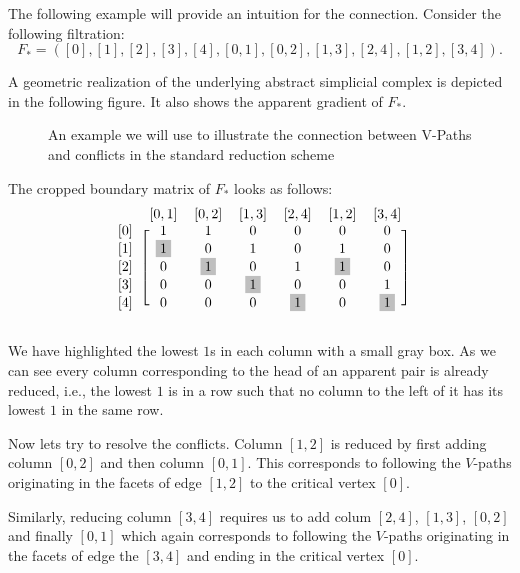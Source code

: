 The following example will provide an intuition for the connection. Consider the following filtration:
\[
    F_* = ([0],[1],[2],[3],[4],[0,1],[0,2], [1,3], [2,4], [1,2], [3,4]).
\]

A geometric realization of the underlying abstract simplicial complex is depicted in the following figure. It also shows the apparent gradient of $F_*$.

\begin{figure}[H]
\noindent%
\centering%

\caption{An example we will use to illustrate the connection between V-Paths and conflicts in the standard reduction scheme}
\label{fig:paths_and_computations}
\end{figure}

The cropped boundary matrix of $F_*$ looks as follows:
\[
\begin{blockarray}{ccccccc}
& [0,1] & [0,2] & [1,3] & [2,4] & [1,2] & [3,4] \\
\begin{block}{c[cccccc]}
             [0] & 1 & 1 & 0 & 0 & 0 & 0 \\*
  \left[1\right] & \colorbox{lightgray}{1} & 0 & 1 & 0 & 1 & 0 \\*
  \left[2\right] & 0 & \colorbox{lightgray}{1}  & 0 & 1 & \colorbox{lightgray}{1}  & 0 \\*
  \left[3\right] & 0 & 0 & \colorbox{lightgray}{1}  & 0 & 0 & 1 \\*
  \left[4\right] & 0 & 0 & 0 & \colorbox{lightgray}{1}  & 0 & \colorbox{lightgray}{1}   \\*
\end{block}
\end{blockarray}
\]

We have highlighted the lowest $1$s in each column with a small gray box. As we can see every column corresponding to the head of an apparent pair is already reduced, i.e., the lowest $1$ is in a row such that no column to the left of it has its lowest $1$ in the same row.

Now lets try to resolve the conflicts. Column $[1,2]$ is reduced by first adding column $[0,2]$ and then column $[0,1]$. This corresponds to following the $V$-paths originating in the facets of edge $[1,2]$ to the critical vertex $[0]$.

Similarly, reducing column $[3,4]$ requires us to add colum $[2,4]$, $[1,3]$, $[0,2]$ and finally $[0,1]$ which again corresponds to following the $V$-paths originating in the facets of edge the $[3,4]$ and ending in the critical vertex $[0]$. \\


